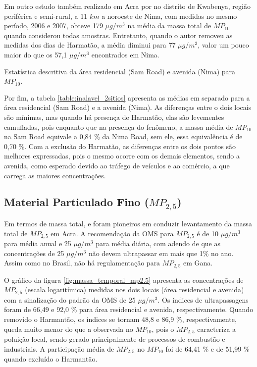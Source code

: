Em outro estudo também realizado em Acra por \citet{aboh2009} no distrito de 
Kwabenya, região periférica e semi-rural, a 11 $km$ a noroeste de Nima, com 
medidas no mesmo período, 2006 e 2007, obteve 179 $\mu g / m^3$ 
na média da massa total de $MP_{10}$ quando considerou todas amostras. 
Entretanto, quando o autor removeu as medidas dos dias de Harmatão, 
a média diminui para 77 $\mu g / m^3$,
valor um pouco maior do que os 57,1 $\mu g/ m^3$ encontrados em Nima.

\begin{table}[H]
  \centering
    
  \caption{Estatística descritiva da área residencial (Sam Road) e avenida (Nima) 
           para $MP_{10}$. \label{table:inalavel_2sitios}}
\end{table}

Por fim, a tabela \ref{table:inalavel_2sitios} apresenta as médias em separado
para a área residencial (Sam Road) e a avenida (Nima). As diferenças 
entre o dois locais são mínimas, mas quando há presença de Harmatão, 
elas são levementes camufladas, pois enquanto que na presença do fenômeno, 
a massa média de $MP_{10}$ na Sam Road equivale a 0,84 \% da Nima Road, 
sem ele, essa equivalência é de 0,70 \%. Com a exclusão do Harmatão, as 
diferenças entre os dois pontos são melhores expressadas, pois o mesmo ocorre 
com os demais elementos, sendo a avenida, como esperado devido ao tráfego de 
veículos e ao comércio, a que carrega as maiores concentrações.

\newpage
\subsection{Material Particulado Fino ($MP_{2,5}$)}

Em termos de massa total, \citet{ARKU2008} e \citet{DIONISIO2010} 
foram pioneiros em conduzir levantamento da massa total de $MP_{2,5}$ em 
Acra. A recomendação da OMS para $MP_{2,5}$ é de 10 $\mu g/m^3$ para média anual
e 25 $\mu g/m^3$ para média diária, com adendo de que as concentrações de 
25 $\mu g/m^3$ não devem ultrapassar em mais que 1\% no ano. Assim como no
Brasil, não há regulamentação para $MP_{2,5}$ em Gana. 

O gráfico da figura \ref{fig:massa_temporal_mp2.5} apresenta as concentrações
de $MP_{2,5}$ (escala logaritímica) medidas nos dois locais 
(área residencial e avenida) com a sinalização do padrão da OMS de 
25 $\mu g/m^3$. Os índices de ultrapassagens foram de 66,49 e 92,0 \% 
para área residencial e avenida, respectivamente. Quando removido o Harmantão, 
os índices se tornam 48,8 e 86,9 \%, respectivamente, queda muito menor do 
que a observada no $MP_{10}$, pois o $MP_{2,5}$ caracteriza a poluição local, 
sendo gerado principalmente de processos de combustão e industriais.
A participação média de $MP_{2,5}$ no $MP_{10}$ foi de 64,41 \% e de 
51,99 \% quando excluído o Harmantão.

